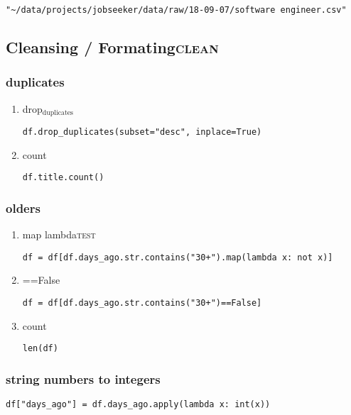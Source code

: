 \documentclass[11pt]{article}
\begin{document}
\begin{verbatim}
"~/data/projects/jobseeker/data/raw/18-09-07/software engineer.csv"
\end{verbatim}
\subsection{Cleansing / Formating\hfill{}\textsc{clean}}
\label{sec:orgeb13c62}
\subsubsection{duplicates}
\label{sec:org2315923}
\begin{enumerate}
\item drop\(_{\text{duplicates}}\)
\label{sec:org0389113}
\begin{verbatim}
df.drop_duplicates(subset="desc", inplace=True)
\end{verbatim}

\item count
\label{sec:org4311707}
\begin{verbatim}
df.title.count()
\end{verbatim}
\end{enumerate}

\subsubsection{olders}
\label{sec:org0244041}
\begin{enumerate}
\item map lambda\hfill{}\textsc{test}
\label{sec:orgc5bbda3}
\begin{verbatim}
df = df[df.days_ago.str.contains("30+").map(lambda x: not x)]
\end{verbatim}

\item ==False
\label{sec:org71e1541}
\begin{verbatim}
df = df[df.days_ago.str.contains("30+")==False]
\end{verbatim}

\item count
\label{sec:orgabbef3c}
\begin{verbatim}
len(df)
\end{verbatim}
\end{enumerate}

\subsubsection{string numbers to integers}
\label{sec:org5f7f1db}
\begin{verbatim}
df["days_ago"] = df.days_ago.apply(lambda x: int(x))
\end{verbatim}
\end{document}
